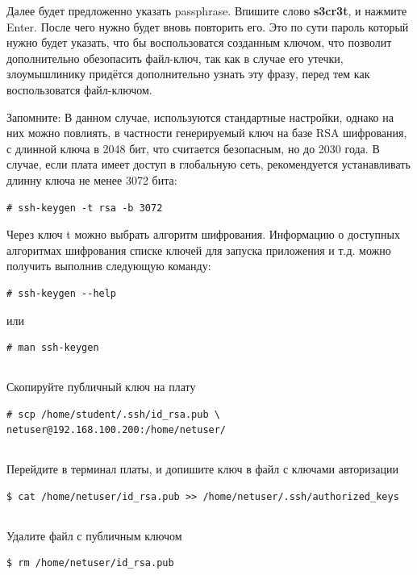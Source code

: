 Далее будет предложенно указать passphrase. Впишите слово \textbf{s3cr3t}\label{ssh:passphrase}, и нажмите Enter. После чего нужно будет вновь повторить его. Это по сути пароль который нужно будет указать, что бы воспользоватся созданным ключом, что позволит дополнительно обезопасить файл-ключ, так как в случае его утечки, злоумышлинику придётся дополнительно узнать эту фразу, перед тем как воспользоватся файл-ключом.  

\begin{Notes}{Запомните:}
	В данном случае, используются стандартные настройки, однако на них можно повлиять, в частности генерируемый ключ на базе RSA шифрования, с длинной ключа в 2048 бит, что считается безопасным, но до 2030 года. В случае, если плата имеет доступ в глобальную сеть, рекомендуется устанавливать длинну ключа не менее 3072 бита:
	\begin{lstlisting}[style=bash]
	# ssh-keygen -t rsa -b 3072
	\end{lstlisting}
	
	Через ключ t можно выбрать алгоритм шифрования. Информацию о доступных алгоритмах шифрования списке ключей для запуска приложения и т.д. можно получить выполнив следующую команду:
	\begin{lstlisting}[style=bash]
	# ssh-keygen --help
	\end{lstlisting}
	или
	\begin{lstlisting}[style=bash]
	# man ssh-keygen
	\end{lstlisting}
\end{Notes}

\subsection{} Скопируйте публичный ключ на плату
\begin{lstlisting}[style=bash]
# scp /home/student/.ssh/id_rsa.pub \
netuser@192.168.100.200:/home/netuser/
\end{lstlisting}

\subsection{} Перейдите в терминал платы, и допишите ключ в файл с ключами авторизации
\begin{lstlisting}[style=bash]
$ cat /home/netuser/id_rsa.pub >> /home/netuser/.ssh/authorized_keys
\end{lstlisting}

\subsection{} Удалите файл с публичным ключом
\begin{lstlisting}[style=bash]
$ rm /home/netuser/id_rsa.pub
\end{lstlisting}


